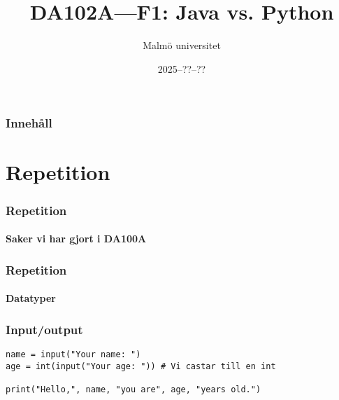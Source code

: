 \documentclass[aspectratio=169]{beamer}
\title{DA102A---F1: Java vs. Python}
\author{Malmö universitet}
\date{2025--??--??}
\institute{Institutionen för datavetenskap och medieteknik}
\begin{document}
\begin{frame}
    \frametitle{Innehåll}

    \begin{multicols}{2}
        \tableofcontents
    \end{multicols}

\end{frame}

\section{Repetition}

\begin{frame}
    \frametitle{Repetition}
    \framesubtitle{Saker vi har gjort i DA100A}


\end{frame}

\begin{frame}[fragile]
    \frametitle{Repetition}
    \framesubtitle{Datatyper}


\end{frame}

\begin{frame}[fragile]
    \frametitle{Input/output}

    \begin{lstlisting}
name = input("Your name: ")
age = int(input("Your age: ")) # Vi castar till en int

print("Hello,", name, "you are", age, "years old.")
    \end{lstlisting}

\end{frame}
\end{document}
